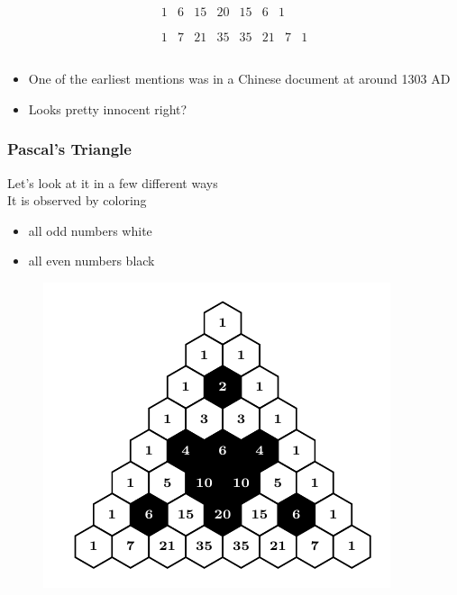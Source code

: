 \documentclass{beamer}
\begin{document}
\begin{frame}
\begin{equation*}
\begin{array}{c}
\begin{array}{ccccccc}
             1 & 6 & 15 & 20 & 15 & 6 & 1 \\
            \end{array}
             \\
            \begin{array}{cccccccc}
             1 & 7 & 21 & 35 & 35 & 21 & 7 & 1 \\
            \end{array}
             \\
            \end{array}
    \end{equation*}
    \begin{itemize}
        \item
        One of the earliest mentions was in a Chinese document at around 1303 AD
        \item
        Looks pretty innocent right?
    \end{itemize}

\end{frame}
\begin{frame}
    \frametitle{Pascal's Triangle}
    Let's look at it in a few different ways \\
    It is observed by coloring 
    \begin{itemize}
        \item
        all odd numbers white
        \item
        all even numbers black
    \end{itemize}

    \begin{figure}
        \centering
        \includegraphics[scale=0.8]{Mod2,7.pdf}
    \end{figure}
    

\end{frame}
\end{document}
